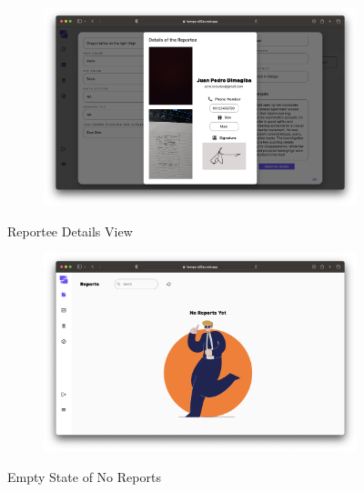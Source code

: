 \begin{figure}[!h]
    \centering
    \begin{subfigure}[c]{1\linewidth}
        \centering
        \includegraphics[scale=0.25]{figures/Chapter4/PNP/Reportee.png}
    \end{subfigure}
    \caption{Reportee Details View}
    \label{fig:ReporteeDetails}
\end{figure}

\begin{figure}[!h]
    \centering
    \begin{subfigure}[c]{1\linewidth}
        \centering
        \includegraphics[scale=0.25]{figures/Chapter4/PNP/NoReportsPNP.png}
    \end{subfigure}
    \caption{Empty State of No Reports}
    \label{fig:NoReportsPNP}
\end{figure}

